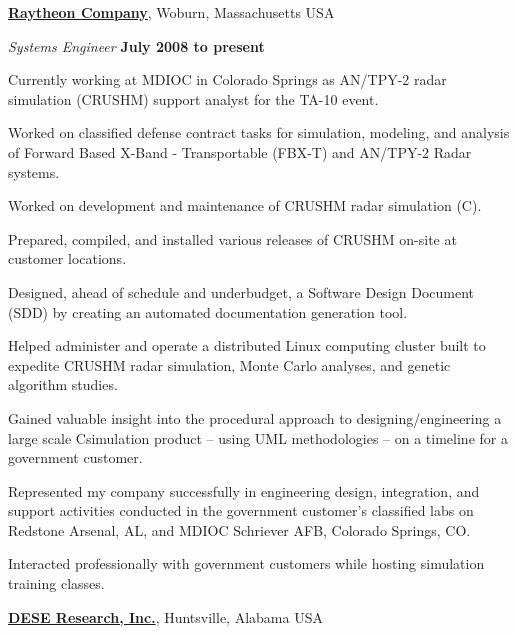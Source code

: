 \documentclass[8pt]{article}
\newenvironment{outerlist}[1][\enskip\textbullet]%
       {\begin{compactenum}[#1]}{\end{compactenum}%
        \vspace{-.3\baselineskip}}
\newenvironment{innerlist}[1][\enskip\textbullet]%
        {\begin{compactenum}[#1]}{\end{compactenum}}
\newcommand{\blankline}{\quad\pagebreak[2]}
\def\CC{{C\nolinebreak[4]\hspace{-.05em}\raisebox{.4ex}{\tiny\bf ++}}}
\begin{document}
\href{http://www.raytheon.com/}{\textbf{Raytheon Company}},
Woburn, Massachusetts USA
\begin{outerlist}

\item[] \textit{Systems Engineer}%
        \hfill \textbf{July 2008 to present}
\begin{innerlist}
\item Currently working at MDIOC in Colorado Springs as AN/TPY-2 radar simulation (CRUSHM) support analyst for the TA-10 event.
\item Worked on classified defense contract tasks for simulation, modeling,
      and analysis of Forward Based X-Band - Transportable (FBX-T) and AN/TPY-2 Radar systems.
\item Worked on development and maintenance of CRUSHM radar simulation (\CC).
\item Prepared, compiled, and installed various releases of CRUSHM on-site at customer locations.
\item Designed, ahead of schedule and underbudget, a Software Design Document (SDD) by creating an automated documentation generation tool.
\item Helped administer and operate a distributed Linux computing cluster built to expedite CRUSHM radar simulation, Monte Carlo analyses, and genetic algorithm studies.
\item Gained valuable insight into the procedural approach to designing/engineering a large scale \CC simulation product -- using UML methodologies -- on a timeline for a government customer.
\item Represented my company successfully in engineering design, integration, and support activities conducted in the government customer's classified labs on Redstone Arsenal, AL, and MDIOC Schriever AFB, Colorado Springs, CO.
\item Interacted professionally with government customers while hosting simulation training classes.\\
\end{innerlist}
\end{outerlist}
\blankline
\newpage
\href{http://www.dese.com/}{\textbf{DESE Research, Inc.}},
Huntsville, Alabama USA
\end{document}
